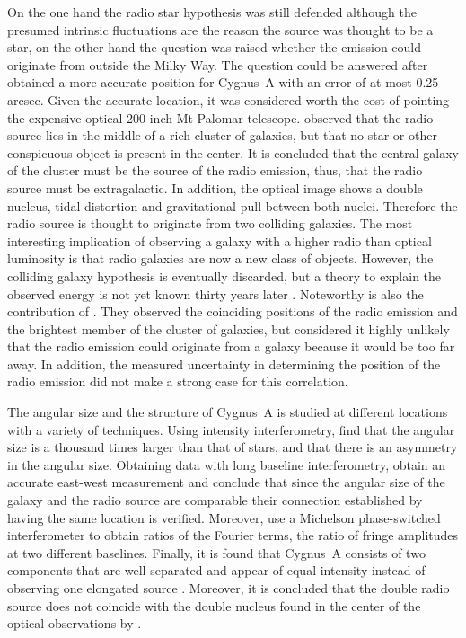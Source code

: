 \documentclass[MScProj_TLRH_ClusterEnergy.tex]{subfiles}
\begin{document}
On the one hand the radio star hypothesis was still defended although the presumed intrinsic fluctuations are the reason the source was thought to be a star, on the other hand the question was raised whether the emission could originate from outside the Milky Way. The question could be answered after \citet{1951Natur.168..555S} obtained a more accurate position for Cygnus~A with an error of at most 0.25 arcsec. Given the accurate location, it was considered worth the cost of pointing the expensive optical 200-inch Mt Palomar telescope. \citet{1954ApJ...119..206B} observed that the radio source lies in the middle of a rich cluster of galaxies, but that no star or other conspicuous object is present in the center. It is concluded that the central galaxy of the cluster must be the source of the radio emission, thus, that the radio source must be extragalactic. In addition, the optical image shows a double nucleus, tidal distortion and gravitational pull between both nuclei. Therefore the radio source is thought to originate from two colliding galaxies. The most interesting implication of observing a galaxy with a higher radio than optical luminosity is that radio galaxies are now a new class of objects. However, the colliding galaxy hypothesis is eventually discarded, but a theory to explain the observed energy is not yet known thirty years later \citep{1982cra..book.....S}. Noteworthy is also the contribution of \citet{1951AuSRA...4..158M}. They observed the coinciding positions of the radio emission and the brightest member of the cluster of galaxies, but considered it highly unlikely that the radio emission could originate from a galaxy because it would be too far away. In addition, the measured uncertainty in determining the position of the radio emission did not make a strong case for this correlation.

The angular size and the structure of Cygnus~A is studied at different locations with a variety of techniques. Using intensity interferometry, \citet{1952Natur.170.1061H} find that the angular size is a thousand times larger than that of stars, and that there is an asymmetry in the angular size. Obtaining data with long baseline interferometry, \citet{1952Natur.170.1063M} obtain an accurate east-west measurement and conclude that since the angular size of the galaxy and the radio source are comparable their connection established by having the same location is verified. Moreover, \citet{1952Natur.170.1065S} use a Michelson phase-switched interferometer to obtain ratios of the Fourier terms, the ratio of fringe amplitudes at two different baselines. Finally, it is found that Cygnus~A consists of two components that are well separated and appear of equal intensity instead of observing one elongated source \citep{1953Natur.172..996J}. Moreover, it is concluded that the double radio source does not coincide with the double nucleus found in the center of the optical observations by \citet{1954ApJ...119..206B}.
\end{document}
